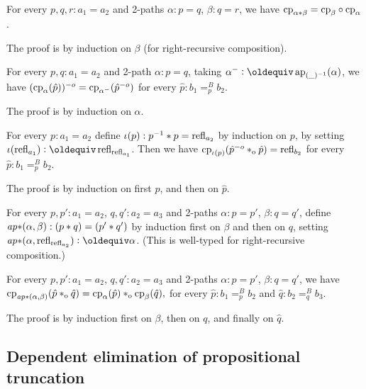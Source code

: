\documentclass[a4paper,12pt]{amsart}
\begin{document}
\begin{lemma}\label{lem:functorial-change-path}
  For every $p,q,r:a_1=a_2$ and 2-paths $\alpha : p = q$, $\beta : q = r$,
  we have $\mathrm{cp}_{\alpha*\beta}=\mathrm{cp}_{\beta}\circ\mathrm{cp}_{\alpha}$.
\end{lemma}

The proof is by induction on $\beta$ (for right-recursive composition).

\begin{lemma}\label{lem:inv2-change-path}
  For every  $p,q:a_1=a_2$ and 2-path $\alpha : p = q$, taking
  $\alpha^- \defeq \ap{(\_)^{-1}}(\alpha)$, we have
  $(\mathrm{cp}_{\alpha}(\hat p))^{-o} = \mathrm{cp}_{\alpha^-}(\hat p^{-o})$
  for every $\hat p: b_1=^B_p b_2$.
\end{lemma}
 The proof is by induction on $\alpha$.

\begin{lemma}\label{lem:invlaw-change-path}
  For every  $p :a_1 = a_2$ define $\iota(p): p^{-1}* p = \mathop{{\mathrm{refl}}_{a_2}}$
  by induction on $p$, by setting $\iota(\refl{a_1})\defeq \refl{\refl{a_1}}$.
  Then we have $\mathrm{cp}_{\iota(p)}(\hat p^{-o} *_{\mathrm{o}} {\hat p}) = \mathop{{\mathrm{refl}}_{b_2}}$
  for every $\hat p: b_1=^B_p b_2$.
\end{lemma}
 The proof is by induction on first $p$, and then on $\hat p$.


\begin{definition}\label{lem:compo-ap-ap}
  For every  $p,p':a_1=a_2$, $q,q':a_2=a_3$ and 2-paths
  $\alpha : p = p'$, $\beta : q = q'$, define
  $\mathop{{\it ap}{*}}(\alpha,\beta): (p* q)=(p'* q')$ by induction
  first on $\beta$ and then on $q$,
  setting $\apc(\alpha,\refl{\refl{a_2}}) \defeq \alpha$.
  (This is well-typed for right-recursive composition.)
\end{definition}

\begin{lemma}\label{lem:compo-change-path}
  For every  $p,p':a_1=a_2$, $q,q':a_2=a_3$ and 2-paths
  $\alpha : p = p'$, $\beta : q = q'$, we have
  $\mathrm{cp}_{\mathop{{\it ap}{*}}(\alpha,\beta)}(\hat p *_{\mathrm{o}} \hat q) =
   \mathrm{cp}_{\alpha}(\hat p) *_{\mathrm{o}}  \mathrm{cp}_{\beta}(\hat q),$
  for every $\hat p: b_1=^B_p b_2$ and $\hat q: b_2=^B_q b_3$.
\end{lemma}
 The proof is by induction first on $\beta$, then on $q$, and finally on $\hat q$.

\subsection{Dependent elimination of propositional truncation}\label{sec:proptrunc}
\end{document}
